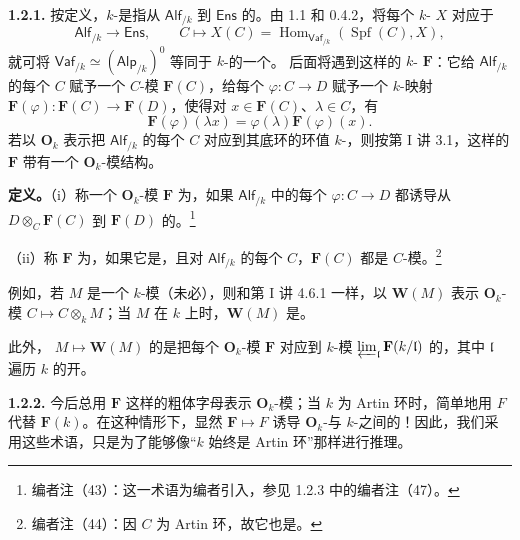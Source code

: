 \textbf{1.2.1.} 按定义，$k$-是指从 $\mathsf{Alf}_{/k}$ 到 $\mathsf{Ens}$ 的。由 1.1 和 0.4.2，将每个 $k$- $X$ 对应于
\[
 \mathsf{Alf}_{/k}\longrightarrow\mathsf{Ens},\qquad C\longmapsto X(C)=\operatorname{Hom}_{\mathsf{Vaf}_{/k}}(\operatorname{Spf}(C),X),
\]
就可将 $\mathsf{Vaf}_{/k}\simeq(\mathsf{Alp}_{/k})^0$ 等同于 $k$-的一个。
后面将遇到这样的 $k$- $\mathbf F$：它给 $\mathsf{Alf}_{/k}$ 的每个 $C$ 赋予一个 $C$-模 $\mathbf F(C)$，给每个 $\varphi:C\to D$ 赋予一个 $k$-映射 $\mathbf F(\varphi):\mathbf F(C)\to\mathbf F(D)$，使得对 $x\in\mathbf F(C)$、$\lambda\in C$，有
\[
 \mathbf F(\varphi)(\lambda x)=\varphi(\lambda)\mathbf F(\varphi)(x).
\]
若以 $\mathbf O_k$ 表示把 $\mathsf{Alf}_{/k}$ 的每个 $C$ 对应到其底环的环值 $k$-，则按第 I 讲 3.1，这样的 $\mathbf F$ 带有一个 $\mathbf O_k$-模结构。

\textbf{定义。}（i）称一个 $\mathbf O_k$-模 $\mathbf F$ 为，如果 $\mathsf{Alf}_{/k}$ 中的每个 $\varphi:C\to D$ 都诱导从 $D\otimes_C\mathbf F(C)$ 到 $\mathbf F(D)$ 的。\footnote{编者注（43）：这一术语为编者引入，参见 1.2.3 中的编者注（47）。}

（ii）称 $\mathbf F$ 为，如果它是，且对 $\mathsf{Alf}_{/k}$ 的每个 $C$，$\mathbf F(C)$ 都是 $C$-模。\footnote{编者注（44）：因 $C$ 为 Artin 环，故它也是。}

例如，若 $M$ 是一个 $k$-模（未必），则和第 I 讲 4.6.1 一样，以 $\mathbf W(M)$ 表示 $\mathbf O_k$-模 $C\mapsto C\otimes_k M$；当 $M$ 在 $k$ 上时，$\mathbf W(M)$ 是。

此外， $M\mapsto\mathbf W(M)$ 的是把每个 $\mathbf O_k$-模 $\mathbf F$ 对应到 $k$-模 $\varprojlim_{\mathfrak l}\mathbf F(k/\mathfrak l)$ 的，其中 $\mathfrak l$ 遍历 $k$ 的开。

\textbf{1.2.2.} 今后总用 $\mathbf F$ 这样的粗体字母表示 $\mathbf O_k$-模；当 $k$ 为 Artin 环时，简单地用 $F$ 代替 $\mathbf F(k)$。在这种情形下，显然 $\mathbf F\mapsto F$ 诱导 $\mathbf O_k$-与 $k$-之间的！因此，我们采用这些术语，只是为了能够像“$k$ 始终是 Artin 环”那样进行推理。

